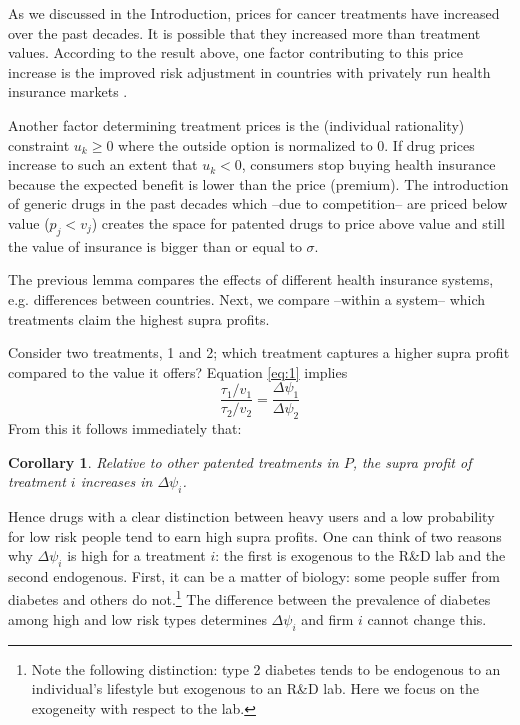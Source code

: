 \documentclass[12pt,english,a4paper]{article}
\newtheorem{corollary}{Corollary}
\begin{document}
As we discussed in the Introduction, prices for cancer treatments have increased over the past decades. It is possible that they increased more than treatment values. According to the result above, one factor contributing to this price increase is the improved risk adjustment in countries with privately run health insurance markets \citep{Schut2011o}.

Another factor determining treatment prices is the (individual rationality) constraint \(u_k \geq 0\) where the outside option is normalized to 0. If drug prices increase to such an extent that \(u_k < 0\), consumers stop buying health insurance because the expected benefit is lower than the price (premium). The introduction of generic drugs in the past decades which --due to competition-- are priced below value (\(p_j < v_j\)) creates the space for patented drugs to price above value and still the value of insurance is bigger than or equal to \(\sigma\).

The previous lemma compares the effects of different health insurance systems, e.g. differences between countries. Next, we compare --within a system-- which treatments claim the highest supra profits.

Consider two treatments, 1 and 2; which treatment captures a higher supra profit compared to the value it offers? Equation \eqref{eq:1} implies
\begin{equation}
\label{eq:42}
\frac{\tau_1/v_1}{\tau_2/v_2} = \frac{\Delta \psi_1}{\Delta \psi_2}
\end{equation}
From this it follows immediately that:

\begin{corollary}
\label{Effect_Delta_psi}
Relative to other patented treatments in \(P\), the supra profit of treatment \(i\) increases in \(\Delta \psi_i\).
\end{corollary}

Hence drugs with a clear distinction between heavy users and a low probability for low risk people tend to earn high supra profits. One can think of two reasons why \(\Delta \psi_i\) is high for a treatment \(i\): the first is exogenous to the R\&D lab and the second endogenous. First, it can be a matter of biology: some people suffer from diabetes and others do not.\footnote{Note the following distinction: type 2 diabetes tends to be endogenous to an individual's lifestyle but exogenous to an R\&D lab. Here we focus on the exogeneity with respect to the lab.} The difference between the prevalence of diabetes among high and low risk types determines \(\Delta \psi_i\) and firm \(i\) cannot change this.
\end{document}

